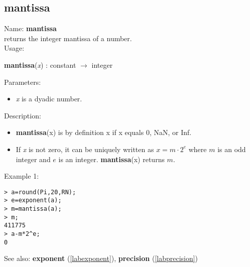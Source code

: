 \subsection{mantissa}
\label{labmantissa}
\noindent Name: \textbf{mantissa}\\
returns the integer mantissa of a number.\\
\noindent Usage: 
\begin{center}
\textbf{mantissa}(\emph{x}) : \textsf{constant} $\rightarrow$ \textsf{integer}
\end{center}
Parameters: 
\begin{itemize}
\item \emph{x} is a dyadic number.
\end{itemize}
\noindent Description: \begin{itemize}

\item \textbf{mantissa}(x) is by definition x if x equals 0, NaN, or Inf.

\item If \emph{x} is not zero, it can be uniquely written as $x = m \cdot 2^e$ where
   $m$ is an odd integer and $e$ is an integer. \textbf{mantissa}(x) returns $m$. 
\end{itemize}
\noindent Example 1: 
\begin{center}\begin{minipage}{15cm}\begin{Verbatim}[frame=single]
> a=round(Pi,20,RN);
> e=exponent(a);
> m=mantissa(a);
> m;
411775
> a-m*2^e;
0
\end{Verbatim}
\end{minipage}\end{center}
See also: \textbf{exponent} (\ref{labexponent}), \textbf{precision} (\ref{labprecision})

